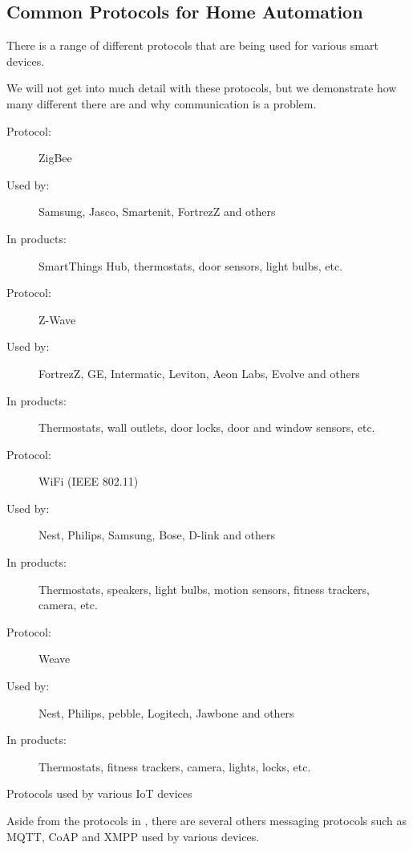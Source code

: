 \subsection{Common Protocols for Home Automation}
There is a range of different protocols that are being used for various smart devices. 

We will not get into much detail with these protocols, 
but we demonstrate how many different there are and why communication is a problem.
\begin{table}
   \begin{description}
       \item[Protocol:] ZigBee
       \item[Used by:] Samsung, Jasco, Smartenit, FortrezZ and others
       \item[In products:] SmartThings Hub, thermostats, door sensors, light bulbs, etc.\\
       
       \item[Protocol:] Z-Wave
       \item[Used by:] FortrezZ, GE, Intermatic, Leviton, Aeon Labs, Evolve and others
       \item[In products:] Thermostats, wall outlets, door locks, door and window sensors, etc.  \\
       
       \item[Protocol:] WiFi (IEEE 802.11)
       \item[Used by:] Nest, Philips, Samsung, Bose, D-link and others
       \item[In products:] Thermostats, speakers, light bulbs, motion sensors, fitness trackers, camera, etc. 
       
       \item[Protocol:] Weave
       \item[Used by:] Nest, Philips, pebble, Logitech, Jawbone and others
       \item[In products:] Thermostats, fitness trackers, camera, lights, locks, etc. 
    \end{description}
    \caption{Protocols used by various IoT devices}\label{table:iotprotocols}
\end{table}

Aside from the protocols in , 
there are several others messaging protocols such as MQTT, CoAP and XMPP used by various devices. 

